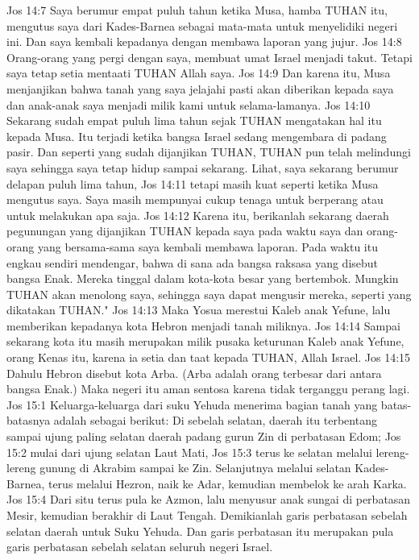 Jos 14:7  Saya berumur empat puluh tahun ketika Musa, hamba TUHAN itu, mengutus saya dari Kades-Barnea sebagai mata-mata untuk menyelidiki negeri ini. Dan saya kembali kepadanya dengan membawa laporan yang jujur.
Jos 14:8  Orang-orang yang pergi dengan saya, membuat umat Israel menjadi takut. Tetapi saya tetap setia mentaati TUHAN Allah saya.
Jos 14:9  Dan karena itu, Musa menjanjikan bahwa tanah yang saya jelajahi pasti akan diberikan kepada saya dan anak-anak saya menjadi milik kami untuk selama-lamanya.
Jos 14:10  Sekarang sudah empat puluh lima tahun sejak TUHAN mengatakan hal itu kepada Musa. Itu terjadi ketika bangsa Israel sedang mengembara di padang pasir. Dan seperti yang sudah dijanjikan TUHAN, TUHAN pun telah melindungi saya sehingga saya tetap hidup sampai sekarang. Lihat, saya sekarang berumur delapan puluh lima tahun,
Jos 14:11  tetapi masih kuat seperti ketika Musa mengutus saya. Saya masih mempunyai cukup tenaga untuk berperang atau untuk melakukan apa saja.
Jos 14:12  Karena itu, berikanlah sekarang daerah pegunungan yang dijanjikan TUHAN kepada saya pada waktu saya dan orang-orang yang bersama-sama saya kembali membawa laporan. Pada waktu itu engkau sendiri mendengar, bahwa di sana ada bangsa raksasa yang disebut bangsa Enak. Mereka tinggal dalam kota-kota besar yang bertembok. Mungkin TUHAN akan menolong saya, sehingga saya dapat mengusir mereka, seperti yang dikatakan TUHAN."
Jos 14:13  Maka Yosua merestui Kaleb anak Yefune, lalu memberikan kepadanya kota Hebron menjadi tanah miliknya.
Jos 14:14  Sampai sekarang kota itu masih merupakan milik pusaka keturunan Kaleb anak Yefune, orang Kenas itu, karena ia setia dan taat kepada TUHAN, Allah Israel.
Jos 14:15  Dahulu Hebron disebut kota Arba. (Arba adalah orang terbesar dari antara bangsa Enak.) Maka negeri itu aman sentosa karena tidak terganggu perang lagi.
Jos 15:1  Keluarga-keluarga dari suku Yehuda menerima bagian tanah yang batas-batasnya adalah sebagai berikut: Di sebelah selatan, daerah itu terbentang sampai ujung paling selatan daerah padang gurun Zin di perbatasan Edom;
Jos 15:2  mulai dari ujung selatan Laut Mati,
Jos 15:3  terus ke selatan melalui lereng-lereng gunung di Akrabim sampai ke Zin. Selanjutnya melalui selatan Kades-Barnea, terus melalui Hezron, naik ke Adar, kemudian membelok ke arah Karka.
Jos 15:4  Dari situ terus pula ke Azmon, lalu menyusur anak sungai di perbatasan Mesir, kemudian berakhir di Laut Tengah. Demikianlah garis perbatasan sebelah selatan daerah untuk Suku Yehuda. Dan garis perbatasan itu merupakan pula garis perbatasan sebelah selatan seluruh negeri Israel.
